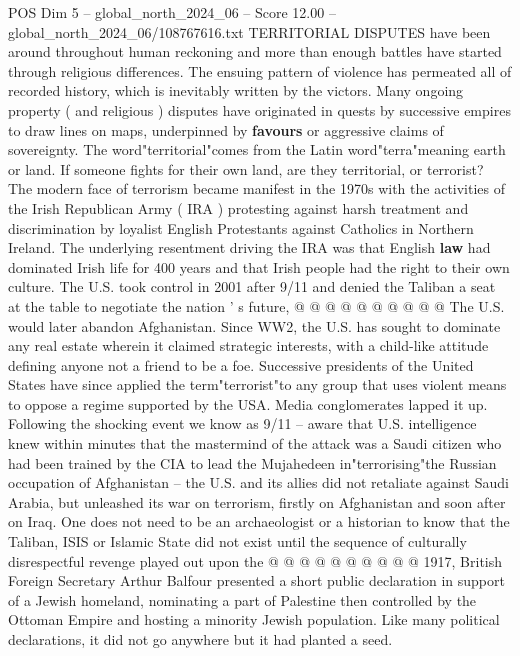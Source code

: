 \begin{textsample}{POS Dim 5 – global\_north\_2024\_06 – Score 12.00 – global\_north\_2024\_06/108767616.txt}  \label{ex:f5_pos_374}
TERRITORIAL DISPUTES have been around throughout human reckoning and more than enough battles have started through religious differences.
The ensuing pattern of violence has permeated all of recorded history, which is inevitably written by the victors.
Many ongoing property ( and religious ) disputes have originated in quests by successive empires to draw lines on maps, underpinned by \textbf{favours} or aggressive claims of sovereignty.
The word"territorial"comes from the Latin word"terra"meaning earth or land.
If someone fights for their own land, are they territorial, or terrorist?
The modern face of terrorism became manifest in the 1970s with the activities of the Irish Republican Army ( IRA ) protesting against harsh treatment and discrimination by loyalist English Protestants against Catholics in Northern Ireland.
The underlying resentment driving the IRA was that English \textbf{law} had dominated Irish life for 400 years and that Irish people had the right to their own culture.
The U.S. took control in 2001 after 9/11 and denied the Taliban a seat at the table to negotiate the nation ' s future, @ @ @ @ @ @ @ @ @ @ The U.S. would later abandon Afghanistan.
Since WW2, the U.S. has sought to dominate any real estate wherein it claimed strategic interests, with a child-like attitude defining anyone not a friend to be a foe.
Successive presidents of the United States have since applied the term"terrorist"to any group that uses violent means to oppose a regime supported by the USA.
Media conglomerates lapped it up.
Following the shocking event we know as 9/11 -- aware that U.S. intelligence knew within minutes that the mastermind of the attack was a Saudi citizen who had been trained by the CIA to lead the Mujahedeen in"terrorising"the Russian occupation of Afghanistan -- the U.S. and its allies did not retaliate against Saudi Arabia, but unleashed its war on terrorism, firstly on Afghanistan and soon after on Iraq.
One does not need to be an archaeologist or a historian to know that the Taliban, ISIS or Islamic State did not exist until the sequence of culturally disrespectful revenge played out upon the @ @ @ @ @ @ @ @ @ @ 1917, British Foreign Secretary Arthur Balfour presented a short public declaration in support of a Jewish homeland, nominating a part of Palestine then controlled by the Ottoman Empire and hosting a minority Jewish population.
Like many political declarations, it did not go anywhere but it had planted a seed.

\end{textsample}
